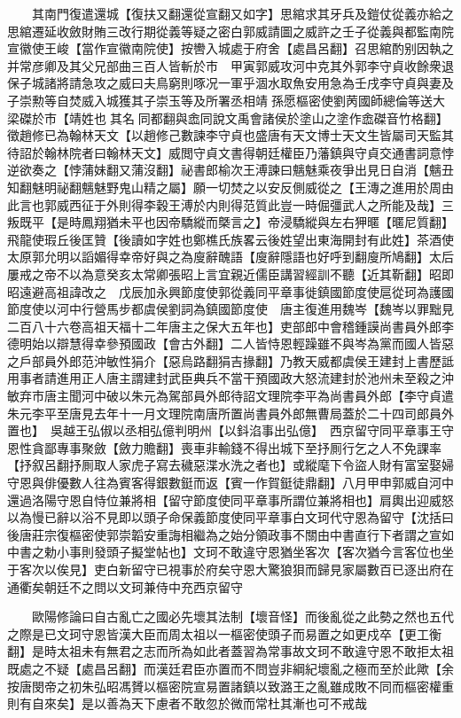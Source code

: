 　　其南門復遣還城【復扶又翻還從宣翻又如字】思綰求其牙兵及鎧仗從義亦給之思綰遷延收斂財賄三改行期從義等疑之密白郭威請圖之威許之壬子從義與都監南院宣徽使王峻【當作宣徽南院使】按轡入城處于府舍【處昌呂翻】召思綰酌别因執之并常彦卿及其父兄部曲三百人皆斬於市　甲寅郭威攻河中克其外郭李守貞收餘衆退保子城諸將請急攻之威曰夫鳥窮則啄况一軍乎涸水取魚安用急為壬戌李守貞與妻及子崇勲等自焚威入城獲其子崇玉等及所署丞相靖孫愿樞密使劉苪國師總倫等送大梁磔於市【靖姓也其名同都翻與嵞同說文禹會諸侯於塗山之塗作嵞磔音竹格翻】徵趙修已為翰林天文【以趙修己數諫李守貞也盛唐有天文博士天文生皆屬司天監其待詔於翰林院者曰翰林天文】威閲守貞文書得朝廷權臣乃藩鎮與守貞交通書詞意悖逆欲奏之【悖蒲妹翻又蒲沒翻】祕書郎榆次王溥諫曰魑魅乘夜爭出見日自消【魑丑知翻魅明祕翻魑魅野鬼山精之屬】願一切焚之以安反側威從之【王漙之進用於周由此言也郭威西征于外則得李穀王溥於内則得范質此豈一時倔彊武人之所能及哉】三叛既平【是時鳳翔猶未平也因帝驕縱而槩言之】帝浸驕縱與左右狎暱【暱尼質翻】飛龍使瑕丘後匡贊【後讀如字姓也鄭樵氏族畧云後姓望出東海開封有此姓】茶酒使太原郭允明以謟媚得幸帝好與之為廋辭醜語【廋辭隱語也好呼到翻廋所鳩翻】太后屢戒之帝不以為意癸亥太常卿張昭上言宜親近儒臣講習經訓不聽【近其靳翻】昭即昭遠避高祖諱改之　戊辰加永興節度使郭從義同平章事徙鎮國節度使扈從珂為護國節度使以河中行營馬步都虞侯劉詞為鎮國節度使　唐主復進用魏岑【魏岑以罪黜見二百八十六卷高祖天福十二年唐主之保大五年也】吏部郎中會稽鍾謨尚書員外郎李德明始以辯慧得幸參預國政【會古外翻】二人皆恃恩輕躁雖不與岑為黨而國人皆惡之戶部員外郎范沖敏性狷介【惡烏路翻狷吉掾翻】乃教天威都虞侯王建封上書歷詆用事者請進用正人唐主謂建封武臣典兵不當干預國政大怒流建封於池州未至殺之沖敏弃市唐主聞河中破以朱元為駕部員外郎待詔文理院李平為尚書員外郎【李守貞遣朱元李平至唐見去年十一月文理院南唐所置尚書員外郎無曹局蓋於二十四司郎員外置也】　吳越王弘俶以丞相弘億判明州【以鈄淊事出弘億】　西京留守同平章事王守恩性貪鄙專事聚斂【斂力贍翻】喪車非輸錢不得出城下至抒厠行乞之人不免課率【抒叙呂翻抒厠取人家虎子寫去穢惡渫水洗之者也】或縱麾下令盜人財有富室娶婦守恩與俳優數人往為賓客得銀數鋌而返【賓一作賀鋌徒鼎翻】八月甲申郭威自河中還過洛陽守恩自恃位兼將相【留守節度使同平章事所謂位兼將相也】肩輿出迎威怒以為慢已辭以浴不見即以頭子命保義節度使同平章事白文珂代守恩為留守【沈括曰後唐莊宗復樞密使郭崇韜安重誨相繼為之始分領政事不關由中書直行下者謂之宣如中書之勅小事則發頭子擬堂帖也】文珂不敢違守恩猶坐客次【客次猶今言客位也坐于客次以俟見】吏白新留守已視事於府矣守恩大驚狼狽而歸見家屬數百已逐出府在通衢矣朝廷不之問以文珂兼侍中充西京留守

　　歐陽修論曰自古亂亡之國必先壞其法制【壞音怪】而後亂從之此勢之然也五代之際是已文珂守恩皆漢大臣而周太祖以一樞密使頭子而易置之如更戍卒【更工衡翻】是時太祖未有無君之志而所為如此者蓋習為常事故文珂不敢違守恩不敢拒太祖既處之不疑【處昌呂翻】而漢廷君臣亦置而不問豈非綱紀壞亂之極而至於此歟【余按唐閔帝之初朱弘昭馮贇以樞密院宣易置諸鎮以致潞王之亂雖成敗不同而樞密權重則有自來矣】是以善為天下慮者不敢忽於微而常杜其漸也可不戒哉

